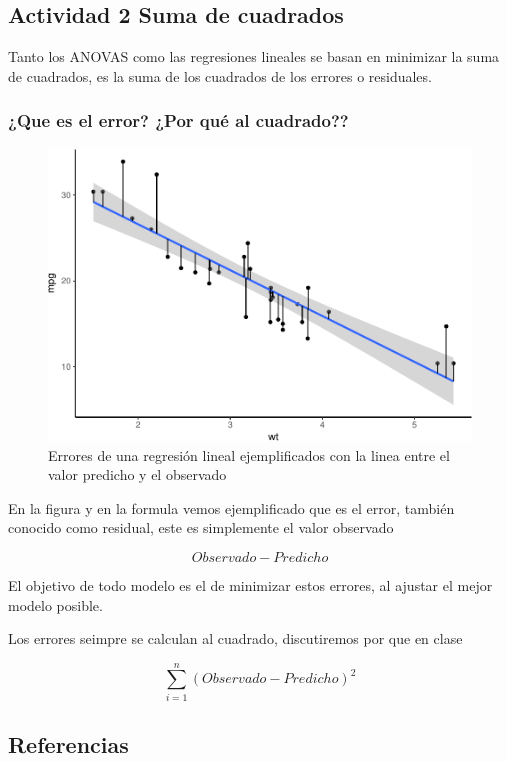 \documentclass[]{article}
\begin{document}
\subsection{Actividad 2 Suma de
cuadrados}\label{actividad-2-suma-de-cuadrados}

Tanto los ANOVAS como las regresiones lineales se basan en minimizar la
suma de cuadrados, es la suma de los cuadrados de los errores o
residuales.

\subsubsection{¿Que es el error? ¿Por qué al
cuadrado??}\label{que-es-el-error-por-que-al-cuadrado}

\begin{figure}
\centering
\includegraphics{Guia3_files/figure-latex/unnamed-chunk-14-1.pdf}
\caption{Errores de una regresión lineal ejemplificados con la linea
entre el valor predicho y el observado}
\end{figure}

En la figura y en la formula vemos ejemplificado que es el error,
también conocido como residual, este es simplemente el valor observado

\[Observado - Predicho\]

El objetivo de todo modelo es el de minimizar estos errores, al ajustar
el mejor modelo posible.

Los errores seimpre se calculan al cuadrado, discutiremos por que en
clase

\[\sum_{i=1}^{n} (Observado - Predicho)^2\]

\subsection*{Referencias}\label{referencias}
\end{document}
